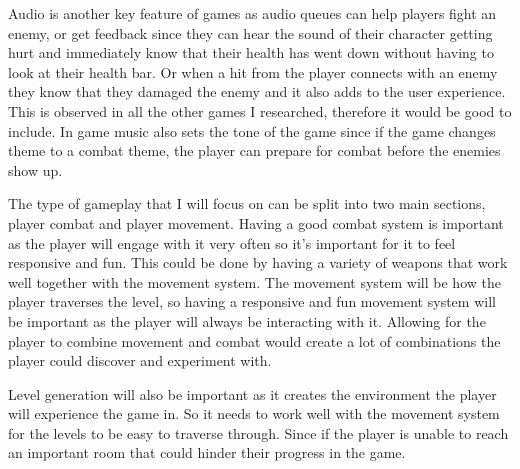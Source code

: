 \documentclass{article}
\newcommand{\parBr}{\vspace{5mm}}%
\begin{document}
Audio is another key feature of games as audio queues can help players fight an enemy, or get feedback since they can hear the sound of their character getting hurt and immediately know that their health has went down without having to look at their health bar. Or when a hit from the player connects with an enemy they know that they damaged the enemy and it also adds to the user experience. This is observed in all the other games I researched, therefore it would be good to include. In game music also sets the tone of the game since if the game changes theme to a combat theme, the player can prepare for combat before the enemies show up.

\parBr

The type of gameplay that I will focus on can be split into two main sections, player combat and player movement. \linebreak
Having a good combat system is important as the player will engage with it very often so it's important for it to feel responsive and fun. This could be done by having a variety of weapons that work well together with the movement system. \linebreak
The movement system will be how the player traverses the level, so having a responsive and fun movement system will be important as the player will always be interacting with it. Allowing for the player to combine movement and combat would create a lot of combinations the player could discover and experiment with.

\parBr

Level generation will also be important as it creates the environment the player will experience the game in. So it needs to work well with the movement system for the levels to be easy to traverse through. Since if the player is unable to reach an important room that could hinder their progress in the game.  
\end{document}
